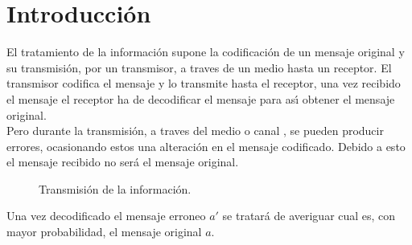 %
%

\chapter{Introducci\'on}

El tratamiento de la informaci\'on supone la codificaci\'on de un mensaje
original y su transmisi\'on, por un transmisor, a traves de un medio hasta un
receptor. El transmisor codifica el mensaje y lo transmite hasta el receptor,
una vez recibido el mensaje el receptor ha de decodificar el mensaje para
as\'{\i} obtener el mensaje original.\\

Pero durante la transmisi\'on, a traves del medio o canal , se pueden producir
errores, ocasionando estos una alteraci\'on en el mensaje codificado. Debido a
esto el mensaje recibido no ser\'a el mensaje original.

\begin{figure}[!hbp]
\begin{center}

\end{center}
\caption{Transmisi\'on de la informaci\'on.}
\end{figure}

Una vez decodificado el mensaje erroneo $a'$ se tratar\'a de averiguar cual es,
con mayor probabilidad, el mensaje original $a$.

%
%


